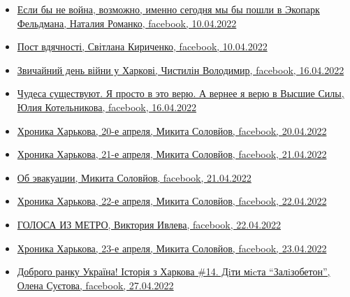 \begin{itemize}
\item \hyperlink{10_04_2022.fb.romanko_natalia.harkov.kobeljaki.numerolog.1.ekopark_feldmana}{%
Если бы не война, возможно, именно сегодня мы бы пошли в Экопарк Фельдмана, %
Наталия Романко, facebook, 10.04.2022%
}

\item \hyperlink{10_04_2022.fb.kirychenko_svitlana.harkiv.1.post_vdjachnosti}{%
Пост вдячності, Світлана Кириченко, facebook, 10.04.2022%
}

\item \hyperlink{16_04_2022.fb.chystilin_volodymyr.harkov.1.den_vijny}{%
Звичайний день війни у Харкові, Чистилін Володимир, facebook, 16.04.2022%
}

\item \hyperlink{16_04_2022.fb.kotelnikova_julia.harkov.psiholog.1.chudesa}{%
Чудеса существуют. Я просто в это верю. А вернее я верю в Высшие Силы, Юлия Котельникова, facebook, %
16.04.2022%
}

\item \hyperlink{20_04_2022.fb.solovjov_mikita.harkov.demsokyra.1.hronika}{%
Хроника Харькова, 20-е апреля, Микита Соловйов, facebook, 20.04.2022%
}

\item \hyperlink{21_04_2022.fb.solovjov_mikita.harkov.demsokyra.1.hronika}{%
Хроника Харькова, 21-е апреля, Микита Соловйов, facebook, 21.04.2022%
}

\item \hyperlink{21_04_2022.fb.solovjov_mikita.harkov.demsokyra.2.evakuacia}{%
Об эвакуации, Микита Соловйов, facebook, 21.04.2022%
}

\item \hyperlink{22_04_2022.fb.solovjov_mikita.harkov.demsokyra.1.hronika}{%
Хроника Харькова, 22-е апреля, Микита Соловйов, facebook, 22.04.2022%
}

\item \hyperlink{22_04_2022.fb.ivleva_viktoria.moskva.ng.1.golosa_iz_metro}{%
ГОЛОСА ИЗ МЕТРО, Виктория Ивлева, facebook, 22.04.2022%
}

\item \hyperlink{23_04_2022.fb.solovjov_mikita.harkov.demsokyra.1.hronika}{%
Хроника Харькова, 23-е апреля, Микита Соловйов, facebook, 23.04.2022%
}

\item \hyperlink{27_04_2022.fb.suetova_olena.kiev.1.istoria_v_harkova_14}{%
Доброго ранку Україна! Історія з Харкова \#14. Дiти мicта \enquote{Залiзобетон}, %
Олена Суєтова, facebook, 27.04.2022%
}


\end{itemize}
